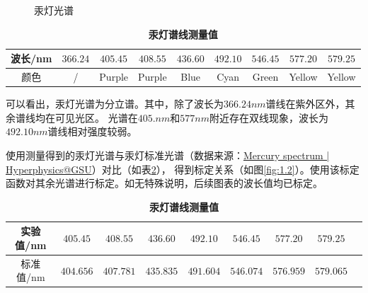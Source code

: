 \documentclass[12pt,a4paper,UTF8]{ctexart}
\begin{document}
\begin{figure}[htbp]
	\centering
	\caption{汞灯光谱}
\end{figure}

\begin{table}[htbp]
	\centering
	\begin{tabular}{ccccccccc}
	\toprule
	波长/nm &$366.24$ &$405.45$ &$408.55$ &$436.60$ &$492.10$ &$546.45$ &$577.20$ &$579.25$\\
	\midrule
	颜色 &/ &Purple &Purple &Blue &Cyan &Green &Yellow &Yellow \\
	\bottomrule
    \end{tabular}
	\caption{\textbf{汞灯谱线测量值}}
	\label{tab:1.1}
\end{table}
	
可以看出，汞灯光谱为分立谱。其中，除了波长为$366.24nm$谱线在紫外区外，其余谱线均在可见光区。
光谱在$405.nm$和$577nm$附近存在双线现象，波长为$492.10nm$谱线相对强度较弱。

使用测量得到的汞灯光谱与汞灯标准光谱（数据来源：\href{http://hyperphysics.phy-astr.gsu.edu/hbase/quantum/atspect2.html#c2}{Mercury spectrum | Hyperphysics@GSU}）对比（如表\ref{tab:1.2}），
得到标定关系（如图\ref{fig:1.2}）。使用该标定函数对其余光谱进行标定。如无特殊说明，后续图表的波长值均已标定。
\begin{table}[htbp]
	\centering
	\begin{tabular}{ccccccccc}
	\toprule
	实验值/nm &$405.45$ &$408.55$ &$436.60$ &$492.10$ &$546.45$ &$577.20$ &$579.25$\\
	\midrule
	标准值/nm &$404.656$ &$407.781$ &$435.835$ &$491.604$ &$546.074$ &$576.959$ &$579.065$\\
	\bottomrule
    \end{tabular}
	\caption{\textbf{汞灯谱线测量值}}
	\label{tab:1.2}
\end{table}
\end{document}

